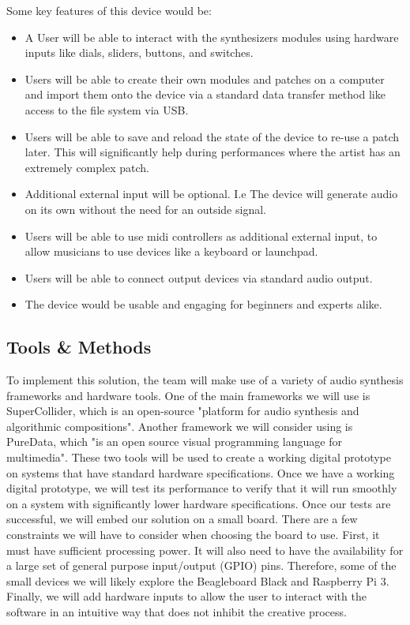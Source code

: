         Some key features of this device would be:
        \begin{itemize}
            \item A User will be able to interact with the synthesizers modules using hardware inputs like dials, sliders, buttons, and switches.
            \item Users will be able to create their own modules and patches on a computer and import them onto the device via a standard data transfer method like access to the file system via USB.
            \item Users will be able to save and reload the state of the device to re-use a patch later. This will significantly help during performances where the artist has an extremely complex patch.
            \item Additional external input will be optional. I.e The device will generate audio on its own without the need for an outside signal.
            \item Users will be able to use midi controllers as additional external input, to allow musicians to use devices like a keyboard or launchpad.
            \item Users will be able to connect output devices via standard audio output.
            \item The device would be usable and engaging for beginners and experts alike.
        \end{itemize}
    
    \subsection{Tools \& Methods}
        To implement this solution, the team will make use of a variety of audio synthesis frameworks and hardware tools.
		One of the main frameworks we will use is SuperCollider, which is an open-source "platform for audio synthesis and algorithmic compositions"\cite{sc}.
		Another framework we will consider using is PureData, which "is an open source visual programming language for multimedia"\cite{pd}.
		These two tools will be used to create a working digital prototype on systems that have standard hardware specifications.
        Once we have a working digital prototype, we will test its performance to verify that it will run smoothly on a system with significantly lower hardware specifications.
        Once our tests are successful, we will embed our solution on a small board.
        There are a few constraints we will have to consider when choosing the board to use.
        First, it must have sufficient processing power.
        It will also need to have the availability for a large set of general purpose input/output (GPIO) pins.
        Therefore, some of the small devices we will likely explore the Beagleboard Black and Raspberry Pi 3.
        Finally, we will add hardware inputs to allow the user to interact with the software in an intuitive way that does not inhibit the creative process.

